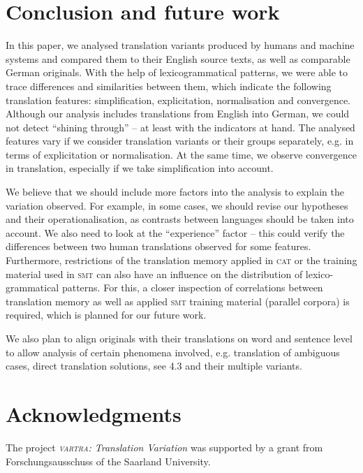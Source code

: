 \documentclass[output=paper]{LSP/langsci}
\begin{document}
\section{Conclusion and future work} \label{sec:4:5}

In this paper, we analysed translation variants produced by humans and machine systems and compared them to their English source texts, as well as comparable German originals. With the help of lexicogrammatical patterns, we were able to trace differences and similarities between them, which indicate the following translation features: simplification, explicitation, normalisation and convergence. Although our analysis includes translations from English into German, we could not detect “shining through” -- at least with the indicators at hand. The analysed features vary if we consider translation variants or their groups separately, e.g. in terms of explicitation or normalisation. At the same time, we observe convergence in translation, especially if we take simplification into account.

We believe that we should include more factors into the analysis to explain the variation observed. For example, in some cases, we should revise our hypotheses and their operationalisation, as contrasts between languages should be taken into account. We also need to look at the “experience” factor – this could verify the differences between two human translations observed for some features. Furthermore, restrictions of the translation memory applied in \textsc{cat} or the training material used in \textsc{smt} can also have an influence on the distribution of lexico-grammatical patterns. For this, a closer inspection of correlations between translation memory as well as applied \textsc{smt} training material (parallel corpora) is required, which is planned for our future work.

We also plan to align originals with their translations on word and sentence level to allow analysis of certain phenomena involved, e.g. translation of ambiguous cases, direct translation solutions, see 4.3 and their multiple variants.

\section*{Acknowledgments}
The project \textit{\textsc{vartra}: Translation Variation} was supported by a grant from Forschungsausschuss of the Saarland University.


\printbibliography[heading=subbibliography,notkeyword=this]
\end{document}
